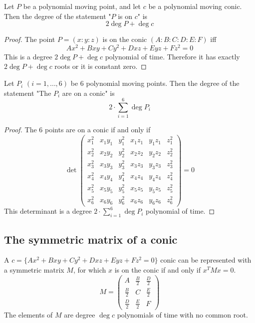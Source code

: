 \documentclass[a4paper]{article}
\begin{document}
\begin{theorem}
    Let $P$ be a polynomial moving point, and let $c$ be a polynomial moving conic. Then the degree of the statement "$P$ is on $c$" is
    $$2\deg P+ \deg c$$
\end{theorem}
\begin{proof}
    The point $P=(x:y:z)$ is on the conic $(A:B:C:D:E:F)$ iff
    $$Ax^2+Bxy+Cy^2+Dxz+Eyz+Fz^2=0$$
    This is a degree $2\deg P+ \deg c$ polynomial of time. Therefore it has exactly $2\deg P+ \deg c$ roots or it is constant zero.
\end{proof}

\begin{theorem}\label{6onconic}
    Let $P_i$ $(i=1,\ldots ,6)$ be 6 polynomial moving points.
    Then the degree of the statement "The $P_i$ are on a conic" is
    $$2\cdot \sum_{i=1}^6 \deg P_i$$
\end{theorem}
\begin{proof}
The 6 points are on a conic if and only if
   $$ \det
\begin{pmatrix}
x_1^2 & x_1 y_1 & y_1^2 & x_1 z_1 & y_1 z_1 & z_1^2 \\[4pt]
x_2^2 & x_2 y_2 & y_2^2 & x_2 z_2 & y_2 z_2 & z_2^2 \\[4pt]
x_3^2 & x_3 y_3 & y_3^2 & x_3 z_3 & y_3 z_3 & z_3^2 \\[4pt]
x_4^2 & x_4 y_4 & y_4^2 & x_4 z_4 & y_4 z_4 & z_4^2 \\[4pt]
x_5^2 & x_5 y_5 & y_5^2 & x_5 z_5 & y_5 z_5 & z_5^2 \\[4pt]
x_6^2 & x_6 y_6 & y_6^2 & x_6 z_6 & y_6 z_6 & z_6^2
\end{pmatrix}
= 0$$
This determinant is a degree $2\cdot \sum_{i=1}^6 \deg P_i$ polynomial of time.
\end{proof}

\subsection{The symmetric matrix of a conic}

A $c=\{Ax^2+Bxy+Cy^2+Dxz+Eyz+Fz^2=0\}$ conic can be represented with a symmetric matrix $M$, for which $x$ is on the conic if and only if $x^TMx=0$.
$$M=\begin{pmatrix}
A & \tfrac{B}{2} & \tfrac{D}{2} \\
\tfrac{B}{2} & C & \tfrac{E}{2} \\
\tfrac{D}{2} & \tfrac{E}{2} & F
\end{pmatrix}
$$
The elements of $M$ are degree $\deg c$ polynomials of time with no common root.
\end{document}
